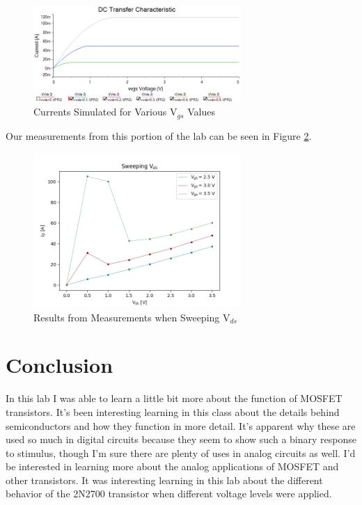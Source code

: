 \documentclass{article}
\begin{document}
\begin{figure}[!htb]
  \begin{center}
    \includegraphics[width=0.7\textwidth]{imgs/sim/Id vs Vds}
  \caption{Currents Simulated for Various V$_{gs}$ Values}
  \label{multiplecurrents}
  \end{center}
\end{figure}

Our measurements from this portion of the lab can be seen in 
Figure \ref{results2}.

\begin{figure}[!htb]
  \begin{center}
  \includegraphics[width=0.7\textwidth]{imgs/meas/sweepvds}
  \caption{Results from Measurements when Sweeping V$_{ds}$}
  \label{results2}
  \end{center}
\end{figure}
  
\section{Conclusion}
In this lab I was able to learn a little bit more about 
the function of MOSFET transistors. It's been interesting
learning in this class about the details behind
semiconductors and how they function in more detail. It's 
apparent why these are used so much in digital circuits 
because they seem to show such a binary response to stimulus,
though I'm sure there are plenty of uses in analog circuits 
as well. I'd be interested in learning more about the analog 
applications of MOSFET and other transistors. It was interesting
learning in this lab about the different behavior of the 
2N2700 transistor when different voltage levels were
applied.
\end{document}
